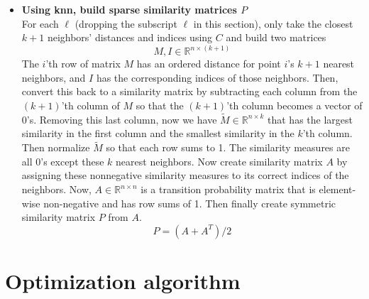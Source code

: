 \documentclass[11pt]{article}
\newcommand{\norm}[1]{\left\lVert#1\right\rVert}
\begin{document}
\begin{itemize}
\item \textbf{Using knn, build sparse similarity matrices $P$}\\
For each $\ell$ (dropping the subscript $\ell$ in this section), only take the closest $k+1$ neighbors' distances and indices using $C$ and build two matrices
$$M, I \in \mathbb{R}^{n \times (k+1)}$$
The $i$'th row of matrix $M$ has an ordered distance for point $i$'s $k+1$ nearest neighbors, and $I$ has the corresponding indices of those neighbors. Then, convert this back to a similarity matrix by subtracting each column from the $(k+1)$'th column of $M$ so that the $(k+1)$'th column becomes a vector of 0's. Removing this last column, now we have $\tilde{M} \in \mathbb{R}^{n \times k}$ that has the largest similarity in the first column and the smallest similarity in the $k$'th column. Then normalize $\tilde{M}$ so that each row sums to 1. The similarity measures are all 0's except these $k$ nearest neighbors. Now create similarity matrix $A$ by assigning these nonnegative similarity measures to its correct indices of the neighbors. Now, $A \in \mathbb{R}^{n \times n}$ is a transition probability matrix that is element-wise non-negative and has row sums of 1. Then finally create symmetric similarity matrix $P$ from $A$.
$$P = (A + A^T) / 2$$
\end{itemize}

\section*{Optimization algorithm}
%
\end{document}
